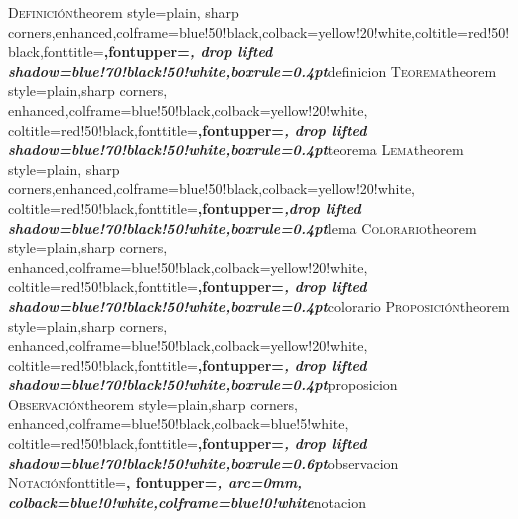\theoremstyle{plain}%
%
 {\textsc{Definici\'on}}{theorem style=plain, sharp
corners,enhanced,colframe=blue!50!black,colback=yellow!20!white,coltitle=red!50!black,fonttitle=\upshape\bfseries\large,fontupper=\itshape,
drop lifted shadow=blue!70!black!50!white,boxrule=0.4pt}{definicion}
%
%
%
%
 {\textsc{Teorema}}{theorem style=plain,sharp
corners, enhanced,colframe=blue!50!black,colback=yellow!20!white,
coltitle=red!50!black,fonttitle=\upshape\bfseries\large,fontupper=\itshape,
drop lifted shadow=blue!70!black!50!white,boxrule=0.4pt}{teorema}
%
%
%
%
%
  {\textsc{Lema}}{theorem style=plain, sharp
corners,enhanced,colframe=blue!50!black,colback=yellow!20!white,
coltitle=red!50!black,fonttitle=\upshape\bfseries\large,fontupper=\itshape,drop lifted shadow=blue!70!black!50!white,boxrule=0.4pt}{lema}
%
%
%
%
%
  {\textsc{Colorario}}{theorem style=plain,sharp
corners, enhanced,colframe=blue!50!black,colback=yellow!20!white,
coltitle=red!50!black,fonttitle=\upshape\bfseries\large,fontupper=\itshape,
drop lifted shadow=blue!70!black!50!white,boxrule=0.4pt}{colorario}
%
%
%
%
%
%
  {\textsc{Proposici\'on}}{theorem style=plain,sharp
corners, enhanced,colframe=blue!50!black,colback=yellow!20!white,
coltitle=red!50!black,fonttitle=\upshape\bfseries\large,fontupper=\itshape,
drop lifted shadow=blue!70!black!50!white,boxrule=0.4pt}{proposicion}
%
%
%
%
{\textsc{Observaci\'on}}{theorem style=plain,sharp
corners, enhanced,colframe=blue!50!black,colback=blue!5!white,
coltitle=red!50!black,fonttitle=\upshape\bfseries\normalsize,fontupper=\itshape,
drop lifted shadow=blue!70!black!50!white,boxrule=0.6pt}{observacion}
%
%
%
  {\textsc{Notaci\'on}}{fonttitle=\bfseries\upshape\large, fontupper=\slshape,
     arc=0mm, colback=blue!0!white,colframe=blue!0!white}{notacion}
%
%
%
\theoremstyle{definition}
\newtheorem{Ejemplo}{Ejemplo}[section]
